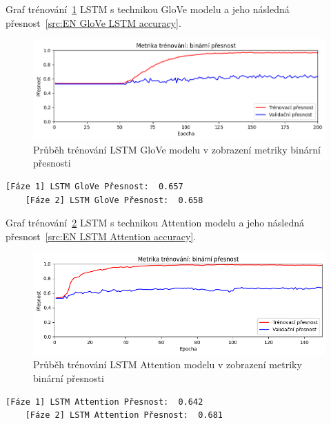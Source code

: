 Graf trénování~\ref{fig:EN LSTM GloVe model train} LSTM s technikou GloVe modelu a jeho následná přesnost~\ref{src:EN GloVe LSTM accuracy}.
\begin{figure}[H]
	\centering
	\includegraphics[width=1\textwidth]{Figures/EN_LSTM_GLOVE_binarni_presnost.png}
	\caption{Průběh trénování LSTM GloVe modelu v zobrazení metriky binární přesnosti}\label{fig:EN LSTM GloVe model train}
\end{figure}
\begin{lstlisting}[label=src:EN GloVe LSTM accuracy, caption={Výsledek GloVe LSTM modelu na anglickém datasetu po trénování~\ref{fig:EN LSTM GloVe model train}}]
	[Fáze 1] LSTM GloVe Přesnost:  0.657
	[Fáze 2] LSTM GloVe Přesnost:  0.658
\end{lstlisting}

Graf trénování~\ref{fig:EN LSTM Attention model train} LSTM s technikou Attention modelu a jeho následná přesnost~\ref{src:EN LSTM Attention accuracy}.
\begin{figure}[H]
	\centering
	\includegraphics[width=1\textwidth]{Figures/EN_LSTM_Attention_binarni_presnost.png}
	\caption{Průběh trénování LSTM Attention modelu v zobrazení metriky binární přesnosti}\label{fig:EN LSTM Attention model train}
\end{figure}
\begin{lstlisting}[label=src:EN LSTM Attention accuracy, caption={Výsledek LSTM Attention modelu na anglickém datasetu po trénování~\ref{fig:EN LSTM Attention model train}}]
	[Fáze 1] LSTM Attention Přesnost:  0.642
	[Fáze 2] LSTM Attention Přesnost:  0.681
\end{lstlisting}

